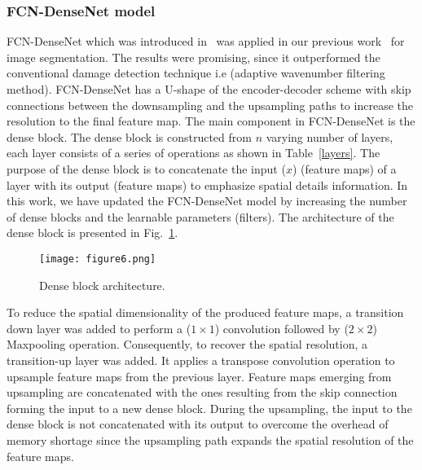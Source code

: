 \subsubsection{FCN-DenseNet model}
FCN-DenseNet which was introduced in~\cite{Jegou} was applied in our previous work~\cite{Ijjeh2021} for image segmentation.
The results were promising, since it outperformed the conventional damage detection technique i.e (adaptive wavenumber filtering method). 
FCN-DenseNet has a U-shape of the encoder-decoder scheme with skip connections between the downsampling and the upsampling paths to increase the resolution to the final feature map.
The main component in FCN-DenseNet is the dense block.
The dense block is constructed from \(n\) varying number of layers, each layer consists of a series of operations as shown in Table~\ref{layers}.
The purpose of the dense block is to concatenate the input (\(x\)) (feature maps) of a layer  with its output (feature maps) to emphasize spatial details information.
In this work, we have updated the FCN-DenseNet model by increasing the number of dense blocks and the learnable parameters (filters).
The architecture of the dense block is presented in Fig.~\ref{dense_block}. 
\begin{figure} [h!]
	\begin{center}
		\texttt{[image: figure6.png]}
	\end{center}
	\caption{Dense block architecture.} 
	\label{dense_block}
\end{figure}
To reduce the spatial dimensionality of the produced feature maps, a transition down layer was added to perform a (\(1\times 1\)) convolution followed by (\(2\times2\)) Maxpooling operation. 
Consequently, to recover the spatial resolution, a transition-up layer was added. 
It applies a transpose convolution operation to upsample feature maps from the previous layer.
Feature maps emerging from upsampling are concatenated with the ones resulting from the skip connection forming the input to a new dense block.
During the upsampling, the input to the dense block is not concatenated with its output to overcome the overhead of memory shortage since the upsampling path expands the spatial resolution of the feature maps. 

